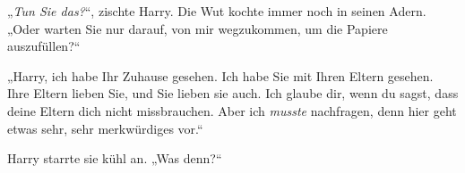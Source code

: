 „\emph{Tun Sie das?}“, zischte Harry. Die Wut kochte immer noch in seinen Adern.
„Oder warten Sie nur darauf, von mir wegzukommen, um die Papiere auszufüllen?“

„Harry, ich habe Ihr Zuhause gesehen. Ich habe Sie mit Ihren Eltern gesehen. Ihre Eltern lieben Sie, und Sie lieben sie auch. Ich glaube dir, wenn du sagst, dass deine Eltern dich nicht missbrauchen. Aber ich \emph{musste} nachfragen, denn hier geht etwas sehr, sehr merkwürdiges vor.“

Harry starrte sie kühl an.
„Was denn?“

